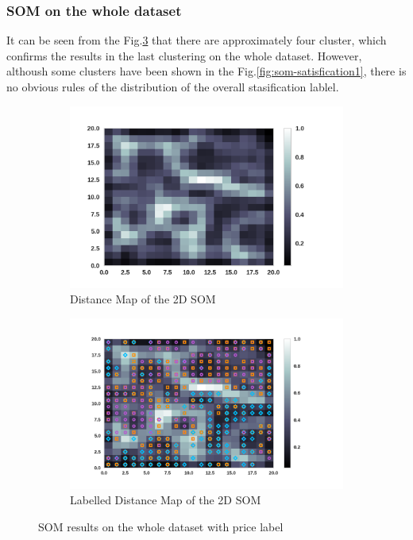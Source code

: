 \documentclass[12pt]{article}
\begin{document}
\subsubsection{SOM on the whole dataset}
It can be seen from the Fig.\ref{fig:som-price1} that there are approximately four cluster, which confirms the results in the last clustering on the whole dataset. However, althoush some clusters have been shown in the Fig.\ref{fig:som-satisfication1}, there is no obvious rules of the distribution of the overall stasification lablel.
\begin{figure}
    \centering
    \begin{subfigure}[b]{0.47\textwidth}
        \includegraphics[width=\textwidth]{images/som-price.png}
        \caption{Distance Map of the 2D SOM}
        \label{fig:som-price}
    \end{subfigure}
    \begin{subfigure}[b]{0.47\textwidth}
        \includegraphics[width=\textwidth]{images/som-price-label.png}
        \caption{Labelled Distance Map of the 2D SOM}
        \label{fig:som-price-label}
    \end{subfigure}
    \caption{SOM results on the whole dataset with price label}\label{fig:som-price1}
\end{figure} 
\end{document}
